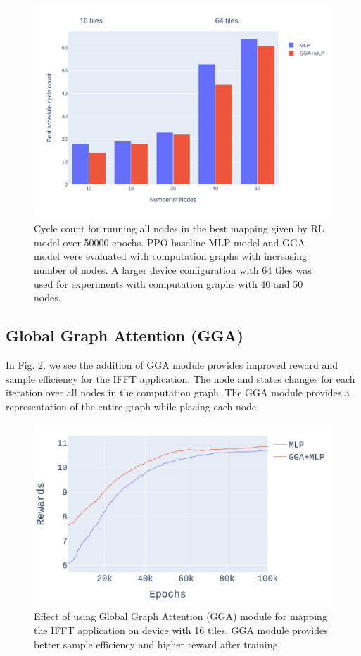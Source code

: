 \begin{figure}[h]
  \centering
  \includegraphics[width=\linewidth]{fig/nodes_graph.pdf}
  \caption{Cycle count for running all nodes in the best mapping given by RL model over 50000 epochs. 
  PPO baseline MLP model and GGA model were evaluated with computation graphs with increasing number of nodes. 
  A larger device configuration with 64 tiles was used for experiments with computation graphs with 40 and 50 nodes. }
  \label{fig:nodes_graph}
\end{figure}


\subsection{Global Graph Attention (GGA)}

In Fig. \ref{fig:ifft_rewards}, we see the addition of GGA module provides improved reward and sample efficiency for the IFFT application. 
The node and states changes for each iteration over all nodes in the computation graph. The GGA module provides a representation of the entire graph while placing each node.

\begin{figure}[h]
  \centering
  \includegraphics[width=\linewidth]{fig/plot_gnn_atten_ppo.pdf}
  \caption{Effect of using Global Graph Attention (GGA) module for mapping the IFFT application on device with 16 tiles. 
  GGA module provides better sample efficiency and higher reward after training. }
  \label{fig:ifft_rewards}
\end{figure}


